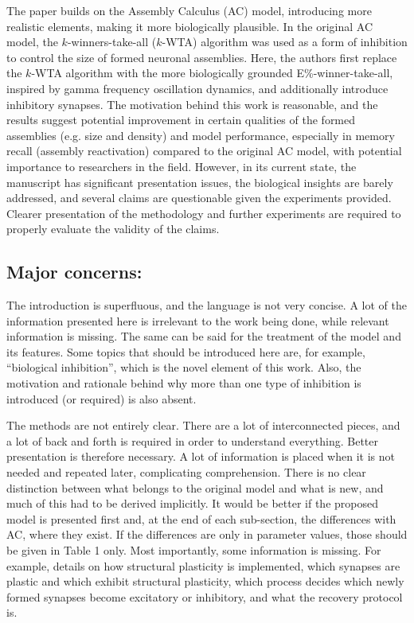 \documentclass[a4paper, 11pt]{article}
\begin{document}
The paper builds on the Assembly Calculus (AC) model, introducing more realistic elements, making it more biologically plausible. In the original AC model, the $k$-winners-take-all ($k$-WTA) algorithm was used as a form of inhibition to control the size of formed neuronal assemblies. Here, the authors first replace the $k$-WTA algorithm with the more biologically grounded E\%-winner-take-all, inspired by gamma frequency oscillation dynamics, and additionally introduce inhibitory synapses. The motivation behind this work is reasonable, and the results suggest potential improvement in certain qualities of the formed assemblies (e.g. size and density) and model performance, especially in memory recall (assembly reactivation) compared to the original AC model, with potential importance to researchers in the field. However, in its current state, the manuscript has significant presentation issues, the biological insights are barely addressed, and several claims are questionable given the experiments provided. Clearer presentation of the methodology and further experiments are required to properly evaluate the validity of the claims.

\subsection*{Major concerns:}

The introduction is superfluous, and the language is not very concise. A lot of the information presented here is irrelevant to the work being done, while relevant information is missing. The same can be said for the treatment of the model and its features. Some topics that should be introduced here are, for example, ``biological inhibition'', which is the novel element of this work. Also, the motivation and rationale behind why more than one type of inhibition is introduced (or required) is also absent.

The methods are not entirely clear. There are a lot of interconnected pieces, and a lot of back and forth is required in order to understand everything. Better presentation is therefore necessary. A lot of information is placed when it is not needed and repeated later, complicating comprehension. There is no clear distinction between what belongs to the original model and what is new, and much of this had to be derived implicitly. It would be better if the proposed model is presented first and, at the end of each sub-section, the differences with AC, where they exist. If the differences are only in parameter values, those should be given in Table 1 only. Most importantly, some information is missing. For example, details on how structural plasticity is implemented, which synapses are plastic and which exhibit structural plasticity, which process decides which newly formed synapses become excitatory or inhibitory, and what the recovery protocol is.
\end{document}
